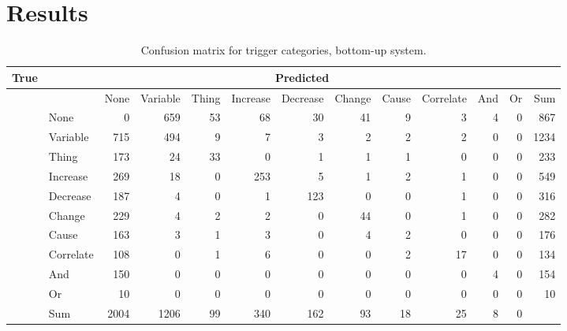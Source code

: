 \section{Results}


\iffalse
\begin{sidewaystable}
\begin{center}
\begin{tabular}{ | r | l | r | r | r | r | r | r | r | r | r | r | r |}
	\hline
	\multirow{11}{*}{True} & \multicolumn{12}{c|}{Predicted} \\ \hline
	&\cellcolor{gray} & None & Variable & Thing & Increase & Decrease & Change & Cause & Correlate & And & Or & Sum\\ \cline{2-13}
	&None & \cellcolor{g} 0 & 659 & 53 & 68 & 30 & 41 & 9 & 3 & 4 & 0 & 867 \\
	&Variable & 715 & \cellcolor{g} 494 & 9 & 7 & 3 & 2 & 2 & 2 & 0 & 0 & 1234 \\
	&Thing & 173 & 24 & \cellcolor{g} 33 & 0 & 1 & 1 & 1 & 0 & 0 & 0 & 233 \\
	&Increase & 269 & 18 & 0 & \cellcolor{g} 253 & 5 & 1 & 2 & 1 & 0 & 0 & 549 \\
	&Decrease & 187 & 4 & 0 & 1 & \cellcolor{g} 123 & 0 & 0 & 1 & 0 & 0 & 316 \\
	&Change & 229 & 4 & 2 & 2 & 0 & \cellcolor{g} 44 & 0 & 1 & 0 & 0 & 282 \\
	&Cause & 163 & 3 & 1 & 3 & 0 & 4 & \cellcolor{g} 2 & 0 & 0 & 0 & 176 \\
	&Correlate & 108 & 0 & 1 & 6 & 0 & 0 & 2 & \cellcolor{g} 17 & 0 & 0 & 134 \\ 
	&And & 150 & 0 & 0 & 0 & 0 & 0 & 0 & 0 & \cellcolor{g} 4 & 0 & 154\\ 
	&Or & 10 & 0 & 0 & 0 & 0 & 0 & 0 & 0 & 0 & \cellcolor{g} 0 & 10 \\ \hline
	&Sum& 2004 & 1206 & 99 & 340 & 162 & 93 & 18 & 25 & 8 & 0 & \\ \hline
\end{tabular}
\end{center}
\caption{Confusion matrix for trigger categories, bottom-up system.}
\label{tees_trigger_conf}
\end{sidewaystable}

